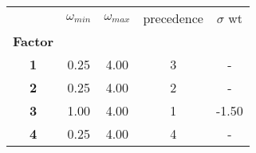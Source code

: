 \begin{tabular}{ccccc}
    \toprule
    {}              & $\omega_{min}$ & $\omega_{max}$ & precedence & $\sigma$ wt \\
    \textbf{Factor} &                &                &            &             \\
    \midrule
    \textbf{1     } & 0.25           & 4.00           & 3          & -           \\
    \textbf{2     } & 0.25           & 4.00           & 2          & -           \\
    \textbf{3     } & 1.00           & 4.00           & 1          & -1.50       \\
    \textbf{4     } & 0.25           & 4.00           & 4          & -           \\
    \bottomrule
\end{tabular}

